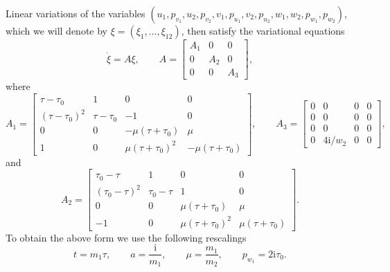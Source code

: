 \documentclass[11pt]{article}
\numberwithin{equation}{section}
\numberwithin{equation}{section}
\begin{document}
Linear variations of the variables
$(u_1, p_{v_1},u_2,p_{v_2},v_1,p_{u_1},v_2,p_{u_2},w_1, w_2,
p_{w_1},p_{w_2})$, which we will denote by $\xi=(\xi_1, \ldots, \xi_{12})$, then
satisfy the variational equations
\begin{equation}
 \label{eq:varg}
 \dot \xi = A\xi, \qquad A = \begin{bmatrix}
 A_1 & 0 & 0\\
 0 & A_2 & 0\\
 0 & 0 & A_3
 \end{bmatrix}\!,
\end{equation}
where
\begin{equation*}
 A_1 = \begin{bmatrix}
 \tau -\tau_0& 1 & 0 & 0\\
 (\tau-\tau_0)^2 & \tau-\tau_0 & -1 & 0\\
 0 & 0 & -\mu(\tau+\tau_0) & \mu \\
 1 & 0 & \mu(\tau+\tau_0)^2 & -\mu(\tau+\tau_0)
 \end{bmatrix}\!,\qquad
 A_3 = \begin{bmatrix}
 0 & 0 & 0 & 0\\
 0 & 0 & 0 & 0\\
 0 & 0 & 0 & 0 \\
 0 & 4\mathrm{i}/w_2 & 0 & 0
 \end{bmatrix}\!,
\end{equation*}
and
\begin{equation*}
 A_2 = \begin{bmatrix}
 \tau_0-\tau & 1 & 0 & 0\\
 (\tau_0-\tau)^2 & \tau_0-\tau & 1 & 0\\
 0 & 0 & \mu(\tau+\tau_0) & \mu \\
 -1 & 0 & \mu(\tau+\tau_0)^2 & \mu(\tau+\tau_0)
 \end{bmatrix}\!.
\end{equation*}
To obtain the above form we use the following rescalings
\begin{equation*}
 t = m_1\tau,\qquad
 a = \frac{\mathrm{i}}{m_1},\qquad
 \mu = \frac{m_1}{m_2}, \qquad
 p_{w_1}=2 \mathrm{i} \tau_0.
\end{equation*}
\end{document}
